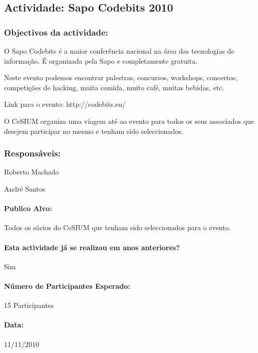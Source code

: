 \subsection{Actividade: Sapo Codebits 2010}

\subsubsection*{Objectivos da actividade:}
O Sapo Codebits é a maior conferência nacional na área das tecnologias de informação. É organizada pela Sapo e completamente gratuita.

Neste evento podemos encontrar palestras, concursos, workshops, concertos, competições de hacking, muita comida, muito café, muitas bebidas, etc.

Link para o evento: http://codebits.eu/

O CeSIUM organiza uma viagem até ao evento para todos os seus associados que desejem participar no mesmo e tenham sido seleccionados.

\subsubsection*{Responsáveis:}
\begin{itemizedash}
	\item{Roberto Machado}
	\item{André Santos}
\end{itemizedash}

\paragraph{Publico Alvo: }
Todos os sócios do CeSIUM que tenham sido seleccionados para o evento.

\paragraph{Esta actividade já se realizou em anos anteriores?}
Sim

\paragraph{Número de Participantes Esperado:}
15 Participantes

\paragraph{Data:} 11/11/2010 

